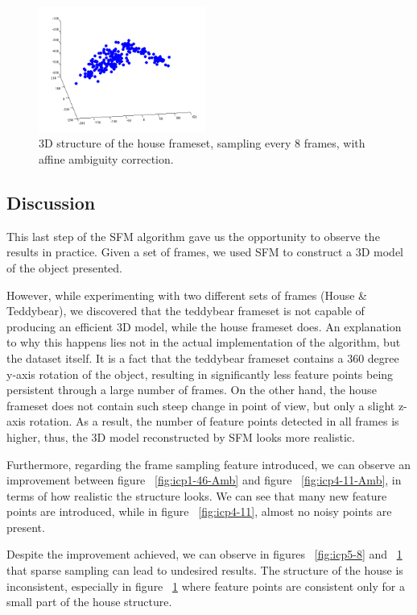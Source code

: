 \begin{figure}[ht!]
  \centering
    \includegraphics[width=0.49\textwidth]{figures/icp8-5.png}
    \caption{3D structure of the house frameset, sampling every 8 frames, with affine ambiguity correction.}
    \label{fig:icp8-5}
\end{figure}



\subsection{Discussion}
This last step of the SFM algorithm gave us the opportunity to observe the results in practice. Given a set of frames, we used SFM to construct a 3D model of the object presented. 

However, while experimenting with two different sets of frames (House \& Teddybear), we discovered that the teddybear frameset is not capable of producing an efficient 3D model, while the house frameset does. An explanation to why this happens lies not in the actual implementation of the algorithm, but the dataset itself. It is a fact that the teddybear frameset contains a 360 degree y-axis rotation of the object, resulting in significantly less feature points being persistent through a large number of frames. 
On the other hand, the house frameset does not contain such steep change in point of view, but only a slight z-axis rotation. As a result, the number of feature points detected in all frames is higher, thus, the 3D model reconstructed by SFM looks more realistic.

Furthermore, regarding the frame sampling feature introduced, we can observe an improvement between figure ~\ref{fig:icp1-46-Amb} and figure ~\ref{fig:icp4-11-Amb}, in terms of how realistic the structure looks. We can see that many new feature points are introduced, while in figure ~\ref{fig:icp4-11}, almost no noisy points are present.

Despite the improvement achieved, we can observe in figures ~\ref{fig:icp5-8} and ~\ref{fig:icp8-5} that sparse sampling can lead to undesired results. The structure of the house is inconsistent, especially in figure ~\ref{fig:icp8-5} where feature points are consistent only for a small part of the house structure. 

